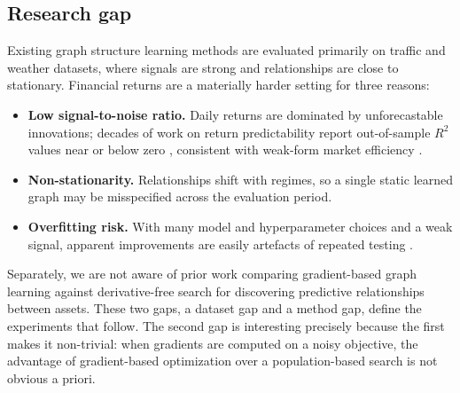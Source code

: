 \subsection{Research gap}

Existing graph structure learning methods are evaluated primarily on traffic and weather datasets, where signals are strong and relationships are close to stationary. Financial returns are a materially harder setting for three reasons:

\begin{itemize}[nosep]
    \item \textbf{Low signal-to-noise ratio.} Daily returns are dominated by unforecastable innovations; decades of work on return predictability report out-of-sample $R^2$ values near or below zero \parencite{welch2008comprehensive}, consistent with weak-form market efficiency \parencite{fama1970efficient}.
    \item \textbf{Non-stationarity.} Relationships shift with regimes, so a single static learned graph may be misspecified across the evaluation period.
    \item \textbf{Overfitting risk.} With many model and hyperparameter choices and a weak signal, apparent improvements are easily artefacts of repeated testing \parencite{harvey2016cross,lopezdeprado2014backtest}.
\end{itemize}

Separately, we are not aware of prior work comparing gradient-based graph learning against derivative-free search for discovering predictive relationships between assets. These two gaps, a dataset gap and a method gap, define the experiments that follow. The second gap is interesting precisely because the first makes it non-trivial: when gradients are computed on a noisy objective, the advantage of gradient-based optimization over a population-based search is not obvious a priori.
